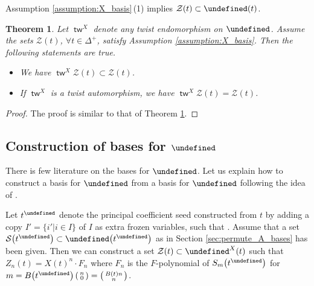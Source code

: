 \documentclass[10pt,a4paper]{amsart}
\renewcommand{\tilde}[1]{\widetilde{#1}}
\newcommand{\opname}[1]{\operatorname{\mathsf{#1}}}
\newcommand{\cS}{{\mathcal S}}
\newcommand{\cZ}{{\mathcal Z}}
\newcommand{\tw}{{\tilde{w}}}
\let\upClAlg\undefined
\let\XClAlg\undefined
\let\LP\undefined
\let\Id\undefined
\let\prin\undefined
\renewcommand{\tw}{\opname{tw}}
\newcommand{\upClAlg}{\mathcal{U}^A}
\newcommand{\XClAlg}{\mathcal{U}^X}
\newcommand{\LP}{{\mathcal{LP}}}
\newcommand{\Id}{{\opname{Id}}}
\newcommand{\prin}{{\opname{prin}}}
\renewcommand{\tw}{\opname{tw}}
\numberwithin{equation}{section}
\newtheorem{Theorem}{Theorem}[section]
\begin{document}
Assumption \ref{assumption:X_basis}\,(1) implies $\cZ(t)\subset\XClAlg(t)$.

\begin{Theorem}\label{thm:twist_X_basis}
Let $\tw^{X}$ denote any twist endomorphism on $\XClAlg$. Assume
the sets $\cZ(t)$, $\forall t\in\Delta^{+}$, satisfy Assumption
{\rm \ref{assumption:X_basis}}. Then the following statements are true.
\begin{itemize}\itemsep=0pt
\item[$(1)$] We have $\tw^{X}\cZ(t)\subset\cZ(t)$.
\item[$(2)$] If $\tw^{X}$ is a twist automorphism, we have $\tw^{X}\cZ(t)=\cZ(t)$.
\end{itemize}
\end{Theorem}

\begin{proof}
The proof is
similar to that of Theorem \ref{thm:twist_X_basis}.
\end{proof}

\subsection[Construction of bases for U\^{}X]{Construction of bases for $\boldsymbol{\XClAlg}$}\label{sec:construction_X_bases}

There is few literature on the bases for $\XClAlg$. Let us explain
how to construct a basis for $\XClAlg$ from a basis for $\upClAlg$
following the idea of \cite{gross2018canonical}.

Let $t^{\prin}$ denote the principal coefficient seed constructed
from $t$ by adding a copy ${I'\!=\!\{i'|i\in I\}}$ of $I$ as extra frozen
variables, such that \smash{$B\big(t^{\prin}\big)=\left(\begin{smallmatrix}
B(t) & -\Id\\
\Id & 0
\end{smallmatrix}\right)$}. Assume that a set $\cS\big(t^{\prin}\big)\subset \upClAlg\big(t^{\prin}\big)$ as in Section \ref{sec:permute_A_bases} has been given. Then we
can construct a set $\cZ(t)\subset\LP^{X}(t)$ such that $Z_{n}(t)=X(t)^{n}\cdot F_{n}$
where $F_{n}$ is the $F$-polynomial of $S_{m}\big(t^{\prin}\big)$ for $m=B\big(t^{\prin}\big)\left(\begin{smallmatrix}
 n\\
 0
 \end{smallmatrix}\right)=\left(\begin{smallmatrix}
B(t)n\\
n
\end{smallmatrix}\right)$.
\end{document}
